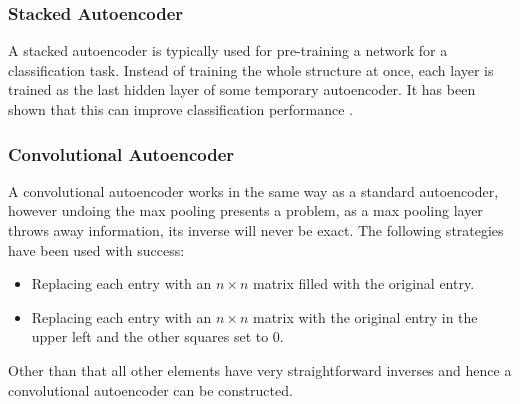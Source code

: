 \documentclass[9pt]{article} \usepackage{amsmath, amsthm, amssymb}
\begin{document}
\subsubsection{Stacked Autoencoder}

A stacked autoencoder is typically used for pre-training a network for a classification task.
Instead of training the whole structure at once, each layer is trained as the last hidden
layer of some temporary autoencoder. It has been shown that this can improve classification performance \cite{stacks}.


\subsubsection{Convolutional Autoencoder}
A convolutional autoencoder works in the same way as a standard autoencoder, however
undoing the max pooling presents a problem, as a max pooling layer throws away
information, its inverse will never be exact. The following strategies have been
used with success:
\begin{itemize}
    \item Replacing each entry with an $n \times n$ matrix filled with the original
    entry.
    \item Replacing each entry with an  $n\times n$  matrix with
    the original entry in the upper left and the other squares set to 0. \cite{Dosovitskiy2015}
\end{itemize}

Other than that all other elements have very straightforward inverses and hence
a convolutional autoencoder can be constructed.
\end{document}
